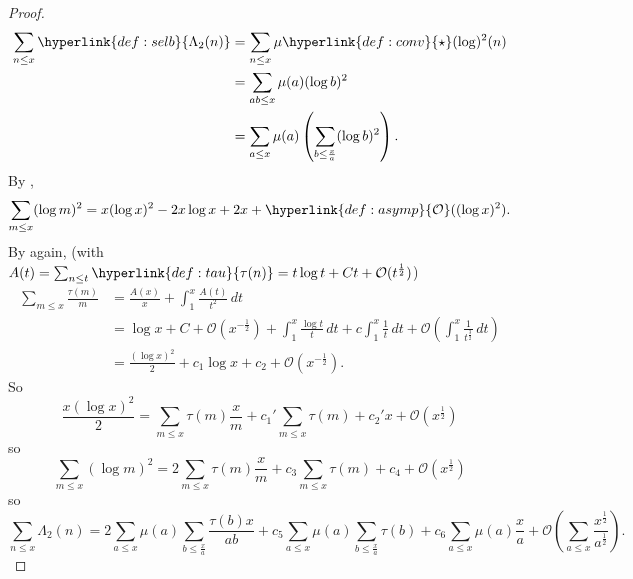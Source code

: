\documentclass{article}
\newcommand{\1}{\mathbbm{1}}
\newcommand{\bigO}{\mathcal{O}}
\begin{document}
\begin{proof}
  \begin{align*}
    \sum_{n \leq x} \hyperlink{def:selb}{\Lambda_2(n)} &= \sum_{n \leq x} \mu \hyperlink{def:conv}{\star}(\log)^2(n) \\
                                 &= \sum_{ab \leq x} \mu(a) (\log b)^2 \\
                                 &= \sum_{a \leq x} \mu(a) \left(\sum_{b \leq \frac x a} (\log b)^2\right).
  \end{align*}
  By ,
  \begin{equation*}
    \sum_{m \leq x} (\log m)^2 = x (\log x)^2 - 2 x \log x + 2 x + \hyperlink{def:asymp}{\bigO}((\log x)^2).
  \end{equation*}
  By  again, (with $A(t) = \sum_{n \leq t} \hyperlink{def:tau}{\tau(n)} = t \log t + Ct + \bigO(t^{\frac 12})$)
  \begin{align*}
    \sum_{m \leq x} \frac{\tau(m)}{m} &= \frac{A(x)}{x} + \int_1^x \frac{A(t)}{t^2} \, dt \\
                                      &= \log x + C + \bigO(x^{-\frac 12}) + \int_1^x \frac{\log t}{t} \, dt + c \int_1^x \frac 1t \, dt + \bigO\left(\int_1^x \frac{1}{t^{\frac{3}{2}}} \, dt\right) \\
                                      &= \frac{(\log x)^2}{2} + c_1 \log x + c_2 + \bigO(x^{-\frac{1}{2}}).
  \end{align*}
  So
  \begin{equation*}
    \frac{x (\log x)^2}{2} = \sum_{m \leq x} \tau(m) \frac{x}{m} + c_1' \sum_{m \leq x} \tau(m) + c_2'x + \bigO(x^{\frac{1}{2}})
  \end{equation*}
  so
  \begin{equation*}
    \sum_{m \leq x} (\log m)^2 = 2 \sum_{m \leq x} \tau(m) \frac{x}{m} + c_3 \sum_{m \leq x} \tau(m) + c_4 + \bigO(x^{\frac{1}{2}})
  \end{equation*}
  so
  \begin{equation*}
    \sum_{n \leq x} \Lambda_2(n) = 2 \sum_{a \leq x} \mu(a) \sum_{b \leq \frac xa} \frac{\tau(b) x}{ab} + c_5 \sum_{a \leq x} \mu(a) \sum_{b \leq \frac xa} \tau(b) + c_6 \sum_{a \leq x} \mu(a) \frac xa + \bigO\left(\sum_{a \leq x} \frac{x^{\frac 12}}{a^{\frac 12}}\right).
  \end{equation*}


\end{proof}
\end{document}
